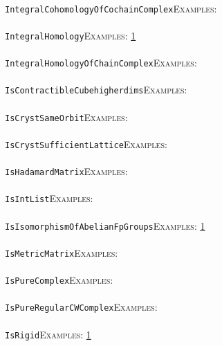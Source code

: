 \documentclass[a4paper,11pt]{report}
\begin{document}
{{ \\
 \texttt{IntegralCohomologyOfCochainComplex}{\nobreakspace}{\nobreakspace}{\nobreakspace}{\nobreakspace}\textsc{Examples:} \\
 \\
 \texttt{IntegralHomology}{\nobreakspace}{\nobreakspace}{\nobreakspace}{\nobreakspace}\textsc{Examples:} \href{../www/SideLinks/About/aboutPerformance.html} {1}{\nobreakspace} \\
 \\
 \texttt{IntegralHomologyOfChainComplex}{\nobreakspace}{\nobreakspace}{\nobreakspace}{\nobreakspace}\textsc{Examples:} \\
 \\
 \texttt{IsContractibleCube{\textunderscore}higherdims}{\nobreakspace}{\nobreakspace}{\nobreakspace}{\nobreakspace}\textsc{Examples:} \\
 \\
 \texttt{IsCrystSameOrbit}{\nobreakspace}{\nobreakspace}{\nobreakspace}{\nobreakspace}\textsc{Examples:} \\
 \\
 \texttt{IsCrystSufficientLattice}{\nobreakspace}{\nobreakspace}{\nobreakspace}{\nobreakspace}\textsc{Examples:} \\
 \\
 \texttt{IsHadamardMatrix}{\nobreakspace}{\nobreakspace}{\nobreakspace}{\nobreakspace}\textsc{Examples:} \\
 \\
 \texttt{IsIntList}{\nobreakspace}{\nobreakspace}{\nobreakspace}{\nobreakspace}\textsc{Examples:} \\
 \\
 \texttt{IsIsomorphismOfAbelianFpGroups}{\nobreakspace}{\nobreakspace}{\nobreakspace}{\nobreakspace}\textsc{Examples:} \href{tutorial/chap1.html} {1}{\nobreakspace} \\
 \\
 \texttt{IsMetricMatrix}{\nobreakspace}{\nobreakspace}{\nobreakspace}{\nobreakspace}\textsc{Examples:} \\
 \\
 \texttt{IsPureComplex}{\nobreakspace}{\nobreakspace}{\nobreakspace}{\nobreakspace}\textsc{Examples:} \\
 \\
 \texttt{IsPureRegularCWComplex}{\nobreakspace}{\nobreakspace}{\nobreakspace}{\nobreakspace}\textsc{Examples:} \\
 \\
 \texttt{IsRigid}{\nobreakspace}{\nobreakspace}{\nobreakspace}{\nobreakspace}\textsc{Examples:} \href{tutorial/chap8.html} {1}{\nobreakspace} \\
}}
\end{document}
